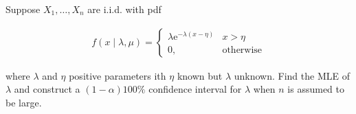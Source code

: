 
\begin{exercise}

Suppose $X_1, \dots, X_n$ are i.i.d. with pdf

\begin{align*}
    f(x \mid \lambda, \mu)
    =
    \begin{cases}
        \lambda \mathrm e^{-\lambda (x - \eta)}
        & x > \eta \\
        0,
        & \text{otherwise}
    \end{cases}
\end{align*}

where $\lambda$ and $\eta$ positive parameters ith $\eta$ known but $\lambda$ unknown.
Find the MLE of $\lambda$ and construct a $(1 - \alpha) 100 \%$ confidence interval for $\lambda$ when $n$ is assumed to be large.

\end{exercise}


